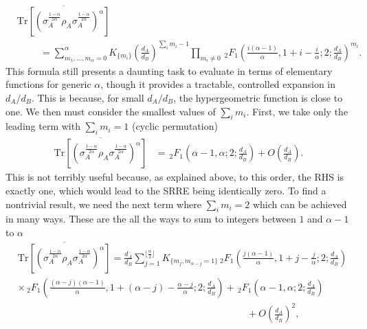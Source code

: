 \documentclass[a4paper,11pt]{article}
\newcommand{\Tr}{\text{Tr}}
\newcommand*{\SR}[1]{\textcolor{magenta}{[SR: \textsf{#1}]}}
\begin{document}
\begin{align}
    &\overline{\Tr\left[\left( \sigma_A^{\frac{1-\alpha}{2\alpha}}
    {
    \rho^{\ }_A 
    }
    \sigma_A^{\frac{1-\alpha}{2\alpha}}\right)^{\alpha}\right]} \nonumber
    \\
    &\hspace{1cm}=\sum_{m_1, \dots, m_{\alpha} = 0}^{\alpha} K_{\{m_i\}} \left(\frac{d_A}{d_B}\right)^{\sum_i m_i- 1}\prod_{m_i \neq 0} \, _2F_1\left(\frac{i({\alpha}-1)}{{\alpha}},1+i-\frac{i}{{\alpha}}
   ;2;\frac{d_A}{d_B}\right)^{m_i }.
   \label{exact_SRRE_moments}
\end{align}
This formula still presents a daunting task to evaluate in terms of elementary functions for generic $\alpha$, though it provides a tractable, controlled expansion in $d_A/d_B$. This is because, for small $d_A/d_B$, the hypergeometric function is close to one. We then must consider the smallest values of $\sum_i m_i$. First, we take only the leading term with $\sum_i m_i = 1$ (cyclic permutation)
\begin{align}
    \overline{\Tr\left[\left( \sigma_A^{\frac{1-\alpha}{2\alpha}}
    {
    \rho^{\ }_A
    }
    \sigma_A^{\frac{1-\alpha}{2\alpha}}\right)^{\alpha}\right]} &=   \, _2F_1\left({{\alpha}-1},\alpha
   ;2;\frac{d_A}{d_B}\right)+O\left(\frac{d_A}{d_B}\right).
\end{align}
This is not terribly useful because, as explained above, to this order, the RHS is exactly one, which would lead to the SRRE 
being identically zero. To find a nontrivial result, we need the next term where $\sum_i m_i = 2$ which can be achieved in many ways. These are the all the ways to sum to integers between $1$ and $\alpha-1$ to $\alpha$
\begin{align}
    &\overline{\Tr\left[\left( \sigma_A^{\frac{1-\alpha}{2\alpha}}
    {
    \rho^{\ }_A 
    }\sigma_A^{\frac{1-\alpha}{2\alpha}}\right)^{\alpha}\right]} =\frac{d_A}{d_B}\sum_{j = 1}^{\lfloor \frac{\alpha}{2} \rfloor} K_{\{m_j , m_{\alpha - j} = 1\}} \, _2F_1\left(\frac{j({\alpha}-1)}{{\alpha}},1+j-\frac{j}{{\alpha}}
   ;2;\frac{d_A}{d_B}\right)
   \nonumber
   \\
   &\times\, _2F_1\left(\frac{(\alpha -j)({\alpha}-1)}{{\alpha}},1+(\alpha -j)-\frac{\alpha -j}{{\alpha}}
   ;2;\frac{d_A}{d_B}\right)+\, _2F_1\left({{\alpha}-1},\alpha
   ;2;\frac{d_A}{d_B}\right)\nonumber
   \\
   &\hspace{10cm}+O\left(\frac{d_A}{d_B}\right)^2,
   \label{SRRE_first_order}
\end{align}
\end{document}

